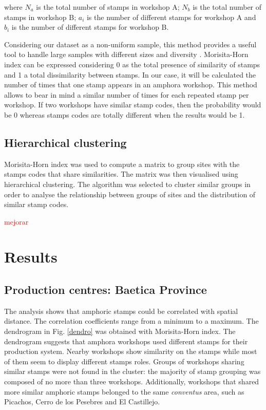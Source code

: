 \documentclass[review]{elsarticle}
\newcommand{\memo}[2]{\textcolor{#1}{#2}}
\newcommand{\maria}[1]{\memo{red}{#1\\}}
\newcommand{\xavi}[1]{\memo{magenta}{XRC: #1\\}}
\begin{document}
where $N_{a}$ is the total number of stamps in workshop A; $N_{b}$ is the total number of stamps in workshop B; $a_{i}$ is the number of different stamps for workshop A and $b_{i}$ is the number of different stamps for workshop B.

Considering our dataset as a non-uniform sample, this method provides a useful tool to handle large samples with different sizes and diversity \citep{wolda_similarity_1981}. Morisita-Horn index can be expressed considering 0 as the total presence of similarity of stamps and 1 a total dissimilarity between stamps. In our case, it will be calculated the number of times that one stamp appears in an amphora workshop. This method allows to bear in mind a similar number of times for each repeated stamp per workshop. If two workshops have similar stamp codes, then the probability would be 0 whereas stamps codes are totally different when the results would be 1. 

\subsection{Hierarchical clustering}

Morisita-Horn index was used to compute a matrix to group sites with the stamps codes that share similarities. The matrix was then visualised using hierarchical clustering. The algorithm was selected to cluster similar groups in order to analyse the relationship between groups of sites and the distribution of similar stamp codes. 

\maria{mejorar}



\section{Results}

\subsection{Production centres: Baetica Province}

The analysis shows that amphoric stamps could be correlated with spatial distance. The correlation coefficients range from a minimum to a maximum. The dendrogram in Fig. \ref{dendro} was obtained with Morisita-Horn index. The dendrogram suggests that amphora workshops used different stamps for their production system. Nearby workshops show similarity on the stamps while most of them seem to display different stamps roles. Groups of workshops sharing similar stamps were not found in the cluster: the majority of stamp grouping was composed of no more than three workshops. Additionally, workshops that shared more similar amphoric stamps belonged to the same \textit{conventus} area, such as Picachos, Cerro de los Pesebres and El Castillejo. 
\end{document}
